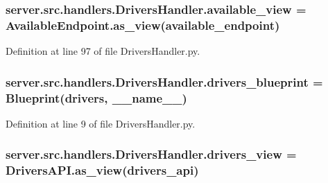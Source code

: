 \subsubsection[{\texorpdfstring{available\+\_\+view}{available_view}}]{\setlength{\rightskip}{0pt plus 5cm}server.\+src.\+handlers.\+Drivers\+Handler.\+available\+\_\+view = Available\+Endpoint.\+as\+\_\+view(\textquotesingle{}available\+\_\+endpoint\textquotesingle{})}\hypertarget{namespaceserver_1_1src_1_1handlers_1_1_drivers_handler_a7c1c480eaf0befef25de1afc735af217}{}\label{namespaceserver_1_1src_1_1handlers_1_1_drivers_handler_a7c1c480eaf0befef25de1afc735af217}


Definition at line 97 of file Drivers\+Handler.\+py.

\subsubsection[{\texorpdfstring{drivers\+\_\+blueprint}{drivers_blueprint}}]{\setlength{\rightskip}{0pt plus 5cm}server.\+src.\+handlers.\+Drivers\+Handler.\+drivers\+\_\+blueprint = Blueprint(\textquotesingle{}drivers\textquotesingle{}, \+\_\+\+\_\+name\+\_\+\+\_\+)}\hypertarget{namespaceserver_1_1src_1_1handlers_1_1_drivers_handler_ac15b68f00fb1e08ff9dd46f13f34e82f}{}\label{namespaceserver_1_1src_1_1handlers_1_1_drivers_handler_ac15b68f00fb1e08ff9dd46f13f34e82f}


Definition at line 9 of file Drivers\+Handler.\+py.

\subsubsection[{\texorpdfstring{drivers\+\_\+view}{drivers_view}}]{\setlength{\rightskip}{0pt plus 5cm}server.\+src.\+handlers.\+Drivers\+Handler.\+drivers\+\_\+view = Drivers\+A\+P\+I.\+as\+\_\+view(\textquotesingle{}drivers\+\_\+api\textquotesingle{})}\hypertarget{namespaceserver_1_1src_1_1handlers_1_1_drivers_handler_ac76d8dfea6082ab7b13dd0d276233de9}{}\label{namespaceserver_1_1src_1_1handlers_1_1_drivers_handler_ac76d8dfea6082ab7b13dd0d276233de9}


